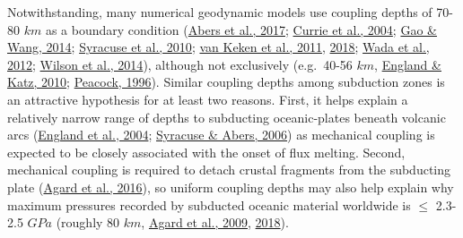 Notwithstanding, many numerical geodynamic models use coupling depths of 70-80 \(km\) as a boundary condition (\protect\hyperlink{ref-abers2017}{Abers et al., 2017}; \protect\hyperlink{ref-currie2004}{Currie et al., 2004}; \protect\hyperlink{ref-gao2014}{Gao \& Wang, 2014}; \protect\hyperlink{ref-syracuse2010}{Syracuse et al., 2010}; \protect\hyperlink{ref-vankeken2011}{van Keken et al., 2011}, \protect\hyperlink{ref-vankeken2018}{2018}; \protect\hyperlink{ref-wada2012}{Wada et al., 2012}; \protect\hyperlink{ref-wilson2014}{Wilson et al., 2014}), although not exclusively (e.g.~40-56 \(km\), \protect\hyperlink{ref-england2010}{England \& Katz, 2010}; \protect\hyperlink{ref-peacock1996}{Peacock, 1996}). Similar coupling depths among subduction zones is an attractive hypothesis for at least two reasons. First, it helps explain a relatively narrow range of depths to subducting oceanic-plates beneath volcanic arcs (\protect\hyperlink{ref-england2004}{England et al., 2004}; \protect\hyperlink{ref-syracuse2006}{Syracuse \& Abers, 2006}) as mechanical coupling is expected to be closely associated with the onset of flux melting. Second, mechanical coupling is required to detach crustal fragments from the subducting plate (\protect\hyperlink{ref-agard2016}{Agard et al., 2016}), so uniform coupling depths may also help explain why maximum pressures recorded by subducted oceanic material worldwide is \(\leq\) 2.3-2.5 \(GPa\) (roughly 80 \(km\), \protect\hyperlink{ref-agard2009}{Agard et al., 2009}, \protect\hyperlink{ref-agard2018}{2018}).

